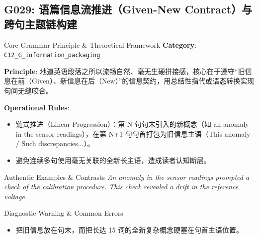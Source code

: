 \subsection{G029: 语篇信息流推进（Given-New Contract）与跨句主题链构建}\label{sec:rule:G029}
\begin{ConceptBox}{Core Grammar Principle \& Theoretical Framework}
\textbf{Category}: \texttt{C12\_G\_information\_packaging}\par\vspace{3pt}
\textbf{Principle}: 地道英语段落之所以流畅自然、毫无生硬拼接感，核心在于遵守“旧信息在前（Given）、新信息在后（New）”的信息契约，用总结性指代或语态转换实现句间无缝咬合。\par\vspace{4pt}
\textbf{Operational Rules}:
\begin{itemize}[leftmargin=1.5em, itemsep=1pt]
  \item 链式推进（Linear Progression）：第 N 句句末引入的新概念（如 an anomaly in the sensor readings），在第 N+1 句句首打包为旧信息主语（This anomaly / Such discrepancies...）。
  \item 避免连续多句使用毫无关联的全新长主语，造成读者认知断层。
\end{itemize}
\end{ConceptBox}
\begin{ExampleBox}{Authentic Examples \& Contrasts}
\textit{An anomaly in the sensor readings prompted a check of the calibration procedure. This check revealed a drift in the reference voltage.}\par\vspace{2pt}
\end{ExampleBox}
\begin{TipBox}{Diagnostic Warning \& Common Errors}
\begin{itemize}[leftmargin=1.5em, itemsep=1pt]
  \item 把旧信息放在句末，而把长达 15 词的全新复杂概念硬塞在句首主语位置。
\end{itemize}
\end{TipBox}
\vspace{6pt}
